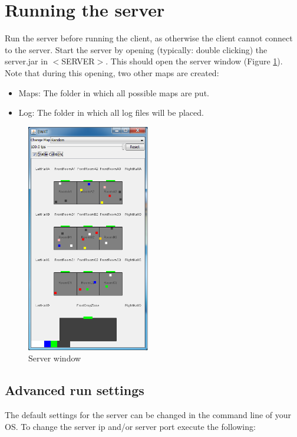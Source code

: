 \documentclass[11pt,a4paper]{article}
\begin{document}
\section{Running the server}


Run the server before running the client, as otherwise the client cannot connect to the server. Start the server by opening (typically: double clicking) the server.jar in $<$SERVER$>$. This should open the server window (Figure  \ref{fig:ServerWindow}). Note that during this opening, two other maps are created: 
\begin{itemize}
\item Maps: The folder in which all possible maps are put.
\item Log: The folder in which all log files will be placed.
\end{itemize}


\begin{figure}[!h]
\begin{center}
   \includegraphics[height=10cm]{server.png}
   \caption{Server window}\label{fig:ServerWindow}
\end{center}
\end{figure}


\subsection{Advanced run settings}
The default settings for the server can be changed in the command line of your OS. To change the server ip and/or server port execute the following:\\
\end{document}
